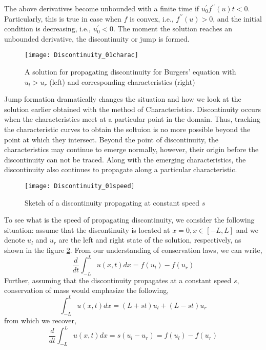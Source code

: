 \documentclass[11pt, a4paper]{report}
\begin{document}
The above derivatives become unbounded with a finite time if $u_{0}^{\prime}f^{\prime\prime}(u)t<0$. Particularly,
this is true in case when $f$ is convex, i.e., $f^{\prime\prime}(u)>0$, and the initial condition is decreasing, 
i.e., $u_0^{\prime}<0$. The moment the solution reaches an unbounded derivative, the discontinuity or jump is formed.

\begin{figure}[h]
    \centering
    \texttt{[image: Discontinuity\_01charac]}
    \caption{A solution for propagating discontinuity for Burgers' equation with $u_l > u_r$ (left) and corresponding characteristics (right)}
    \label{fig:Discontinuity_01charac}
\end{figure}

Jump formation dramatically changes the situation and how we look at the solution earlier obtained with the method 
of Characteristics. Discontinuity occurs when the characteristics meet at a particular point in the domain. Thus, 
tracking the characteristic curves to obtain the soltuion is no more possible beyond the point at which they 
intersect. Beyond the point of discontinuity, the characteristics may continue to emerge normally, however, their
origin before the discontinuity can not be traced. Along with the emerging characteristics, the discontinuity also 
continues to propagate along a particular characteristic.

\begin{figure}[h]
    \centering
    \texttt{[image: Discontinuity\_01speed]}
    \caption{Sketch of a discontinuity propagating at constant speed $s$}
    \label{fig:Discontinuity_01speed}
\end{figure}

To see what is the speed of propagating discontinuity, we consider the following situation: assume that the 
discontinuity is located at $x=0, x\in[-L, L]$ and we denote $u_l$ and $u_r$ are the left and right state of the 
solution, respectively, as shown in the figure \ref{fig:Discontinuity_01speed}. From our understanding of 
conservation laws, we can write, 
\begin{equation*}
    \frac{d}{dt}\int_{-L}^{L}u(x, t)dx = f\left(u_{l}\right) - f\left(u_{r}\right)
\end{equation*}
Further, assuming that the discontinuity propagates at a constant speed $s$, conservation of mass would emphasize 
the following,
\begin{equation*}
    \int_{-L}^{L}u(x, t)dx = (L + st)u_{l} + (L - st)u_{r}
\end{equation*}
from which we recover,
\begin{equation*}
    \frac { d } { d t } \int_{-L}^{L}u(x, t)dx = s\left(u_{l} - u_{r}\right) = f\left(u_{l}\right) - f\left(u_{r}\right)
\end{equation*}
\end{document}
